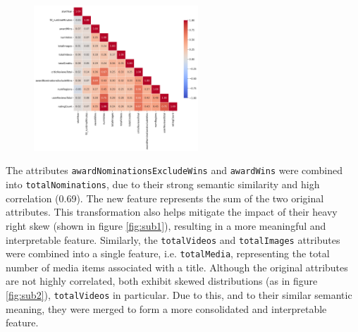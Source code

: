 \begin{figure}[H]
    \centering
    \includegraphics[width=0.55\textwidth]{plots/correlation_matrix.png}
    \label{fig:correlation_matrix}
\end{figure}



The attributes \texttt{awardNominationsExcludeWins} and \texttt{awardWins} were combined into 
\texttt{totalNominations}, due to their strong semantic similarity and high correlation (0.69).
The new feature represents the sum of the two original attributes. This transformation also helps
mitigate the impact of their heavy right skew (shown in figure \ref{fig:sub1}), resulting in a more meaningful and interpretable feature.
Similarly, the \texttt{totalVideos} and \texttt{totalImages} attributes were combined into a single
feature, i.e. \texttt{totalMedia}, representing the total number of media items associated with a title.
Although the original attributes are not highly correlated, both exhibit skewed distributions (as in figure \ref{fig:sub2}), \texttt{totalVideos} in particular.
Due to this, and to their similar semantic meaning, they were merged to form a more consolidated and
interpretable feature.

